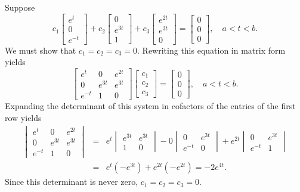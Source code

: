 \documentclass{ximera}
\begin{document}
\begin{example}
\begin{explanation}
Suppose
$$
c_1\begin{bmatrix}e^t\\0\\e^{-t}\end{bmatrix}+
c_2\begin{bmatrix}0\\e^{3t}\\1\end{bmatrix}+c_3
\begin{bmatrix}e^{2t}\\e^{3t}\\0\end{bmatrix}=
\begin{bmatrix}0\\0\\0\end{bmatrix},\quad a<t<b.
$$
We must show that $c_1=c_2=c_3=0$. Rewriting this equation in matrix
form yields
$$
\begin{bmatrix}e^t&0&e^{2t}\\0&e^{3t}&e^{3t}\\e^{-t}&1&0
\end{bmatrix}
\begin{bmatrix}c_1\\c_2\\c_3\end{bmatrix}=
\begin{bmatrix}0\\0\\0\end{bmatrix},\quad a<t<b.
$$
Expanding the determinant of this system in cofactors of the entries
of the first row yields
\begin{eqnarray*}
\begin{vmatrix}e^t&0&e^{2t}\\0&e^{3t}&e^{3t}\\e^{-t}&1&0
\end{vmatrix}&=&e^t
\begin{vmatrix}e^{3t}&e^{3t}\\1&0\end{vmatrix}-0
\begin{vmatrix}0&e^{3t}\\e^{-t}&0\end{vmatrix}
+e^{2t}\begin{vmatrix}0&e^{3t}\\e^{-t}&1\end{vmatrix}\\
&=&e^t(-e^{3t})+e^{2t}(-e^{2t})=-2e^{4t}.
\end{eqnarray*}
Since this determinant is never zero,
$c_1=c_2=c_3=0$.
\end{explanation}
\end{example}
\end{document}
